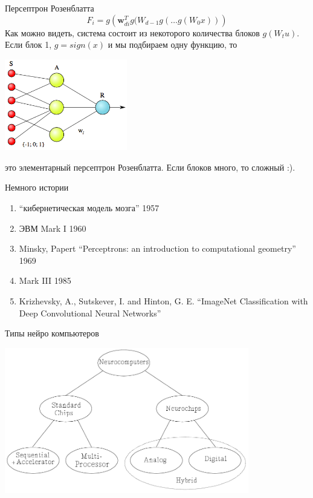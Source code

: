 \documentclass[14pt, fleqn, xcolor={dvipsnames, table}]{beamer}
\begin{document}
\begin{frame}{Персептрон Розенблатта}
\small
$$
F_i = g\left(\mathbf{w}_{di}^T g(W_{d-1}g(\ldots g(W_{0}x))\right)
$$
Как можно видеть, система состоит из некоторого количества блоков $g(W_tu)$. Если блок 1, $g = sign(x)$ и мы подбираем одну функцию, то
\begin{center}
\includegraphics[width=0.4\textwidth]{Simple_perceptron}
\end{center}
это элементарный персептрон Розенблатта. Если блоков много, то сложный :).
\end{frame}

\begin{frame}{Немного истории}
\begin{enumerate}
  \item ``кибернетическая модель мозга'' 1957
  \item ЭВМ Mark I 1960
  \item Minsky, Papert ``Perceptrons: an introduction to computational geometry'' 1969
  \item Mark III 1985
  \item Krizhevsky, A., Sutskever, I. and Hinton, G. E. ``ImageNet Classification with Deep Convolutional Neural Networks''
\end{enumerate}

\end{frame}

\begin{frame}{Типы нейро компьютеров}
\begin{center}
\includegraphics[width=0.8\textwidth]{neurocomp-types}
\end{center}
\end{frame}
\end{document}
